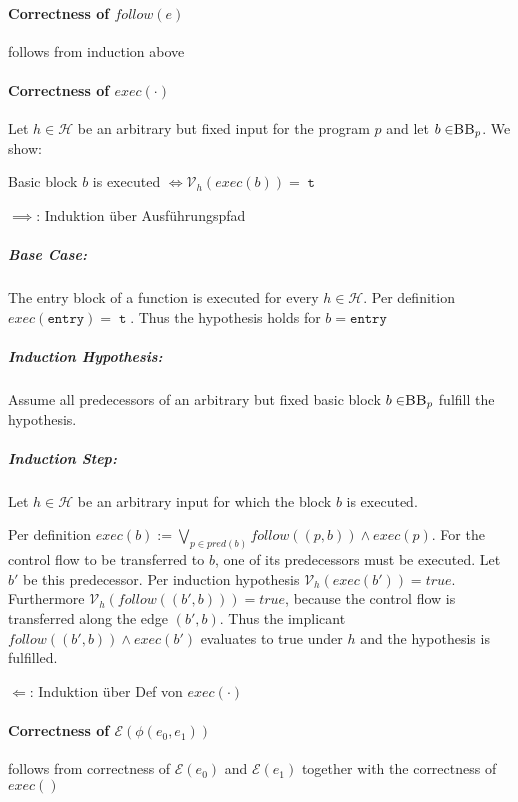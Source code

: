 \paragraph{Correctness of $follow(e)$}
follows from induction above

\paragraph{Correctness of $exec(\cdot)$}
Let $h \in \mathcal{H}$ be an arbitrary but fixed input for the program $p$ and let $b \in \mbb_p$. We show:
\begin{center}
    Basic block $b$ is executed $\iff \mathcal{V}_h(exec(b)) = \mttt$ 
\end{center}

$\implies$: Induktion über Ausführungspfad

\subparagraph{Base Case:} The entry block of a function is executed for every $h \in \mathcal{H}$. Per definition $exec(\mathtt{entry}) = \mttt$. Thus the hypothesis holds for $b = \mathtt{entry}$

\subparagraph{Induction Hypothesis:} Assume all predecessors of an arbitrary but fixed basic block $b \in \mbb_p$ fulfill the hypothesis.

\subparagraph{Induction Step:} Let $h \in \mathcal{H}$ be an arbitrary input for which the block $b$ is executed.

Per definition $exec(b) := \bigvee\limits_{p \in pred(b)} follow((p, b)) \land exec(p)$. For the control flow to be transferred to $b$, one of its predecessors must be executed. Let $b'$ be this predecessor. Per induction hypothesis $\mathcal{V}_h(exec(b')) = true$. Furthermore $\mathcal{V}_h(follow((b', b))) = true$, because the control flow is transferred along the edge $(b', b)$. Thus the implicant $follow((b', b)) \land exec(b')$ evaluates to true under $h$ and the hypothesis is fulfilled.



$\Longleftarrow$: Induktion über Def von $exec(\cdot)$

\paragraph{Correctness of $\mathcal{E}(\phi(e_0, e_1))$}
follows from correctness of $\mathcal{E}(e_0)$ and $\mathcal{E}(e_1)$ together with the correctness of $exec()$
